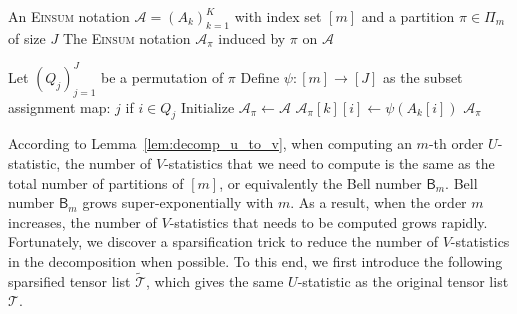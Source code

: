 \documentclass[12pt]{article}
\theoremstyle{plain}
\theoremstyle{definition}
\def\tilde{\widetilde}
\def\Einsum{\textsc{Einsum}}
\newcommand{\sPi}{\pi}
\newcommand{\partition}{\Pi}
\newcommand{\partitionp}[1]{\partition_{#1}}
\newcommand{\Lin}[1]{{\color{purple}{#1}}}
\def\calA{\mathcal{A}}
\def\calT{\mathcal{T}}
\begin{document}
\begin{bibunit}[agsm]
\begin{algorithm}
    \caption{Induced \Einsum{} Notation via Partition}
    \label{alg:induced_expression}
    \begin{algorithmic}[1]
        \Require 
        \Statex An \Einsum{} notation $\calA = (A_k)_{k=1}^K$ with index set $[m]$ and a partition $\sPi \in \partitionp{m}$ of size $J$
        \Ensure The \Einsum{} notation $\calA_\sPi$ induced by $\sPi$ on $\calA$

        \Function{InducedNotation}{$\calA; \sPi$}
            \State Let $(Q_j)_{j=1}^J$ be a permutation of $\sPi$
            \State Define $\psi \colon [m] \to [J]$ as the subset assignment map:
                \State \Return $j$ if $i \in Q_j$ 
            \EndFunction
            \State Initialize $\calA_\sPi \gets \calA$
                    \State $\calA_\sPi[k][i] \gets \psi(A_k[i])$
                \EndFor
            \EndFor
            \State \Return $\calA_\sPi$
        \EndFunction
    \end{algorithmic}
\end{algorithm}

According to Lemma~\ref{lem:decomp_u_to_v}, when computing an $m$-th order $U$-statistic, the number of $V$-statistics that we need to compute is the same as the total number of partitions of $[m]$, or equivalently the Bell number $\mathsf{B}_m$. Bell number $\mathsf{B}_m$ grows super-exponentially with $m$. %
As a result, when the order $m$ increases, the number of $V$-statistics that needs to be computed grows rapidly. Fortunately, we discover a sparsification trick to reduce the number of $V$-statistics in the decomposition when possible. To this end, we first introduce the following sparsified tensor list $\tilde{\calT}$, which gives the same $U$-statistic as the original tensor list $\calT$.


\end{bibunit}
\end{document}
